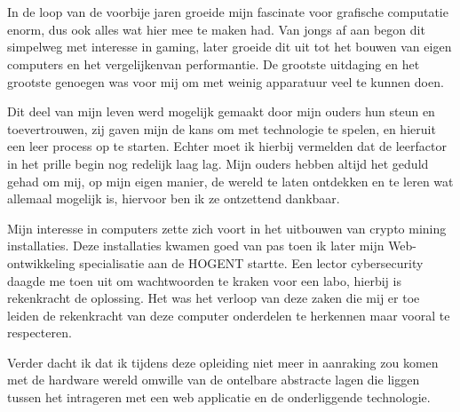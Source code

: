 
\chapter*{}%
\label{ch:voorwoord}


In de loop van de voorbije jaren groeide mijn fascinate voor grafische computatie enorm, dus ook alles wat hier mee te maken had. Van jongs af aan begon dit simpelweg met interesse in gaming, later groeide dit uit tot het bouwen van eigen computers en het vergelijkenvan performantie. De grootste uitdaging en het grootste genoegen was voor mij om met weinig apparatuur veel te kunnen doen. 

\bigbreak{}

Dit deel van mijn leven werd mogelijk gemaakt door mijn ouders hun steun en toevertrouwen, zij gaven mijn de kans om met technologie te spelen, en hieruit een leer process op te starten. Echter moet ik hierbij vermelden dat de leerfactor in het prille begin nog redelijk laag lag. Mijn ouders hebben altijd het geduld gehad om mij, op mijn eigen manier, de wereld te laten ontdekken en te leren wat allemaal mogelijk is, hiervoor ben ik ze ontzettend dankbaar.

\bigbreak{}

Mijn interesse in computers zette zich voort in het uitbouwen van crypto mining installaties. Deze installaties kwamen goed van pas toen ik later mijn Web-ontwikkeling specialisatie aan de HOGENT startte. Een lector cybersecurity daagde me toen uit om wachtwoorden te kraken voor een labo, hierbij is rekenkracht de oplossing. Het was het verloop van deze zaken die mij er toe leiden de rekenkracht van deze computer onderdelen te herkennen maar vooral te respecteren. 

\bigbreak{}

Verder dacht ik dat ik tijdens deze opleiding niet meer in aanraking zou komen met de hardware wereld omwille van de ontelbare abstracte lagen die liggen tussen het intrageren met een web applicatie en de onderliggende technologie.


